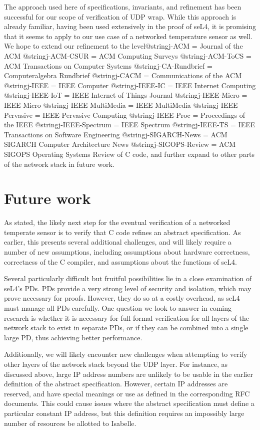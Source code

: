 \documentclass[twoside]{memoir}
\begin{document}
The approach used here of specifications, invariants, and refinement
has been successful for our scope of verification of UDP wrap.
While this approach is already familiar, having been used extensively in the proof of seL4,
it is promising that it seems to apply to our use case of a networked temperature sensor as well.
We hope to extend our refinement to the level@string{j-ACM = {Journal of the {ACM}}}
@string{j-ACM-CSUR = {{ACM} Computing Surveys}}
@string{j-ACM-ToCS = {{ACM} Transactions on Computer Systems}}
@string{j-CA-Rundbrief = {Computeralgebra Rundbrief}}
@string{j-CACM = {Communications of the {ACM}}}
@string{j-IEEE = {{IEEE} Computer}}
@string{j-IEEE-IC = {{IEEE} Internet Computing}}
@string{j-IEEE-IoT = {{IEEE} Internet of Things Journal}}
@string{j-IEEE-Micro = {{IEEE} Micro}}
@string{j-IEEE-MultiMedia = {{IEEE} MultiMedia}}
@string{j-IEEE-Pervasive = {{IEEE} Pervasive Computing}}
@string{j-IEEE-Proc = {Proceedings of the {IEEE}}}
@string{j-IEEE-Spectrum = {{IEEE} Spectrum}}
@string{j-IEEE-TS = {{IEEE} Transactions on Software Engineering}}
@string{j-SIGARCH-News = {{ACM} {SIGARCH} Computer Architecture News}}
@string{j-SIGOPS-Review = {{ACM} {SIGOPS} Operating Systems Review}} of C code, and further expand to other parts of the
network stack in future work.

\chapter{Future work}
As stated, the likely next step for the eventual verification of a networked temperate sensor
is to verify that C code refines an abstract specification.
As earlier, this presents several additional challenges, and will
likely require a number of new assumptions, including assumptions about
hardware correctness, correctness of the C compiler, and assumptions about the functions of seL4.

Several particularly difficult but fruitful possibilities lie in a close examination of
seL4's PDs.
PDs provide a very strong level of security and isolation, which may prove necessary for proofs.
However, they do so at a costly overhead, as seL4 must manage all PDs carefully.
One question we look to answer in coming research is whether it is necessary
for full formal verification for all layers of the network stack to exist in separate PDs,
or if they can be combined into a single large PD, thus achieving better performance.

Additionally, we will likely encounter new challenges when attempting to verify
other layers of the network stack beyond the UDP layer.
For instance, as discussed above, large IP address numbers are unlikely to be usable
in the earlier definition of the abstract specification.
However, certain IP addresses are reserved, and have special meanings or use as defined in
the corresponding RFC documents.
This could cause issues where the abstract specification must define a particular constant
IP address, but this definition requires an impossibly large number of resources be allotted to
Isabelle.
\end{document}
